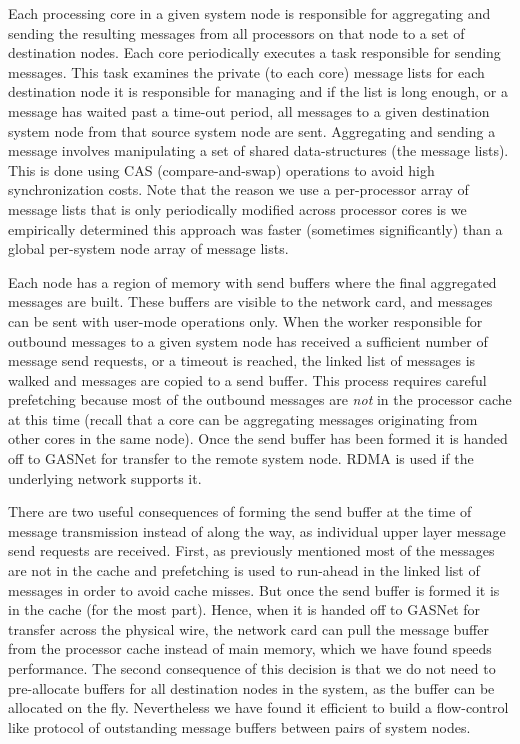 Each processing core in a given system node is responsible for aggregating and sending the resulting messages from all processors on that node to a set of destination nodes.  Each core periodically executes a task responsible for sending messages.  This task examines the private (to each core) message lists for each destination node it is responsible for managing and if the list is long enough, or a message has waited past a time-out period, all messages to a given destination system node from that source system node are sent.  Aggregating and sending a message involves manipulating a set of shared data-structures (the message lists). This is done using CAS (compare-and-swap) operations to avoid high synchronization costs.  Note that the reason we use a per-processor array of message lists that is only periodically modified across processor cores is we empirically determined this approach was faster (sometimes significantly) than a global per-system node array of message lists.

Each node has a region of memory with send buffers where the final aggregated
messages are built. These buffers are visible to the network card, and
messages can be sent with user-mode operations only. When the worker
responsible for outbound messages to a given system node has received a
sufficient number of message send requests, or a timeout is reached, the
linked list of messages is walked and messages are copied to a send buffer.
This process requires careful prefetching because most of the outbound
messages are \emph{not} in the processor cache at this time (recall that a
core can be aggregating messages originating from other cores in the same
node). Once the send buffer has been formed it is handed off to GASNet for
transfer to the remote system node. RDMA is used if the underlying network
supports it. 

There are two useful consequences of forming the send buffer at the time of
message transmission instead of along the way, as individual upper layer
message send requests are received. First, as previously mentioned most of the
messages are not in the cache and prefetching is used to run-ahead in the
linked list of messages in order to avoid cache misses. But once the send
buffer is formed it is in the cache (for the most part). Hence, when it is
handed off to GASNet for transfer across the physical wire, the network card
can pull the message buffer from the processor cache instead of main memory,
which we have found speeds performance. The second consequence of this
decision is that we do not need to pre-allocate buffers for all destination
nodes in the system, as the buffer can be allocated on the fly. Nevertheless
we have found it efficient to build a flow-control like protocol of
outstanding message buffers between pairs of system nodes.

